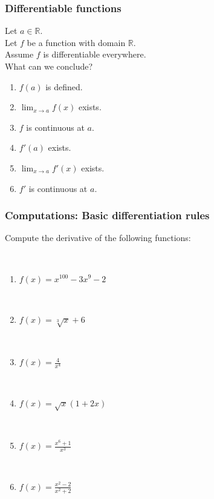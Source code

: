 \documentclass[14pt]{beamer}
\newcommand {\DS} [1] {${\displaystyle #1}$}
\newcommand {\R}{\mathbb{R}}
\begin{document}
\begin{frame}[t]
\frametitle{Differentiable functions}

Let $a \in \R$.  \\
Let $f$ be a function with domain $\R$.  \\
Assume $f$ is differentiable everywhere.  \\
What can we conclude?

\begin{multicols}{2}
\begin{enumerate}
	\item  $f(a)$ is defined.
	\item \DS{\lim_{x \to a} f(x)} exists.
	\item  $f$ is continuous at $a$.
	\item  $f'(a)$ exists.
	\item  \DS{\lim_{x \to a} f'(x)} exists.
	\item  \DS{f'} is continuous at $a$.
\end{enumerate}
\end{multicols}
 
\end{frame}

\begin{frame}
\frametitle{Computations: Basic differentiation rules}

Compute the derivative of the following functions:

\
\begin{multicols}{2}
\begin{enumerate}
	\item  \DS{f(x) = x^{100} - 3x^{9} - 2}

\

	\item  \DS{f(x) = \sqrt[3]{x} + 6}

\

	\item  \DS{f(x) = \frac{4}{x^4}}

\

	\item  \DS{f(x) = \sqrt{x} \left( 1 + 2x \right)}

\

	\item  \DS{f(x) = \frac{x^6+ 1}{x^3}}

\

	\item  \DS{f(x) = \frac{x^2-2}{x^2+2}}
\end{enumerate}
\end{multicols}

\end{frame}
\end{document}
